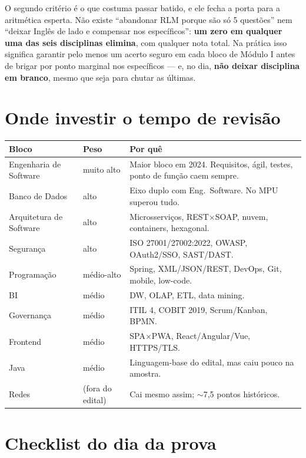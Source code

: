 O segundo critério é o que costuma passar batido, e ele fecha a porta para a
aritmética esperta. Não existe ``abandonar RLM porque são só 5 questões'' nem
``deixar Inglês de lado e compensar nos específicos'': \textbf{um zero em
qualquer uma das seis disciplinas elimina}, com qualquer nota total. Na
prática isso significa garantir pelo menos um acerto seguro em cada bloco de
Módulo I antes de brigar por ponto marginal nos específicos --- e, no dia,
\textbf{não deixar disciplina em branco}, mesmo que seja para chutar as
últimas.

\section{Onde investir o tempo de revisão}

\begin{center}
\begin{tabular}{@{}p{4.6cm}p{2cm}p{6.4cm}@{}}
\toprule
\textbf{Bloco} & \textbf{Peso} & \textbf{Por quê} \\
\midrule
Engenharia de Software & muito alto & Maior bloco em 2024. Requisitos, ágil, testes, ponto de função caem sempre. \\
Banco de Dados & alto & Eixo duplo com Eng.\ Software. No MPU superou tudo. \\
Arquitetura de Software & alto & Microsserviços, REST$\times$SOAP, nuvem, containers, hexagonal. \\
Segurança & alto & ISO 27001/27002:2022, OWASP, OAuth2/SSO, SAST/DAST. \\
Programação & médio-alto & Spring, XML/JSON/REST, DevOps, Git, mobile, low-code. \\
BI & médio & DW, OLAP, ETL, data mining. \\
Governança & médio & ITIL 4, COBIT 2019, Scrum/Kanban, BPMN. \\
Frontend & médio & SPA$\times$PWA, React/Angular/Vue, HTTPS/TLS. \\
Java & médio & Linguagem-base do edital, mas caiu pouco na amostra. \\
Redes & (fora do edital) & Cai mesmo assim; ${\sim}$7,5 pontos históricos. \\
\bottomrule
\end{tabular}
\end{center}

\section{Checklist do dia da prova}

